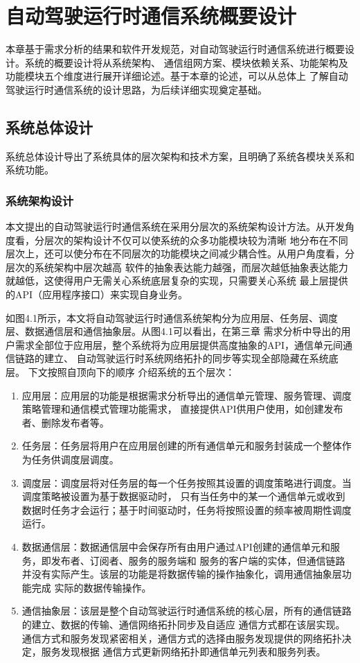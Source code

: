 \chapter{自动驾驶运行时通信系统概要设计}
本章基于需求分析的结果和软件开发规范，对自动驾驶运行时通信系统进行概要设计。系统的概要设计将从系统架构、
通信组网方案、模块依赖关系、功能架构及功能模块五个维度进行展开详细论述。基于本章的论述，可以从总体上
了解自动驾驶运行时通信系统的设计思路，为后续详细实现奠定基础。

\section{系统总体设计}
系统总体设计导出了系统具体的层次架构和技术方案，且明确了系统各模块关系和系统功能。
\subsection{系统架构设计}
本文提出的自动驾驶运行时通信系统在采用分层次的系统架构设计方法。从开发角度看，分层次的架构设计不仅可以使系统的众多功能模块较为清晰
地分布在不同层次上，还可以使分布在不同层次的功能模块之间减少耦合性。从用户角度看，分层次的系统架构中层次越高
软件的抽象表达能力越强，而层次越低抽象表达能力就越低，这使得用户无需关心系统底层复杂的实现，只需要关心系统
最上层提供的API（应用程序接口）来实现自身业务。

如图4.1所示，本文将自动驾驶运行时通信系统架构分为应用层、任务层、调度层、数据通信层和通信抽象层。从图4.1可以看出，在第三章
需求分析中导出的用户需求全部位于应用层，整个系统将为应用层提供高度抽象的API，通信单元间通信链路的建立、
自动驾驶运行时系统网络拓扑的同步等实现全部隐藏在系统底层。
下文按照自顶向下的顺序
介绍系统的五个层次：
\begin{enumerate}
    \item 应用层：应用层的功能是根据需求分析导出的通信单元管理、服务管理、调度策略管理和通信模式管理功能需求，
    直接提供API供用户使用，如创建发布者、删除发布者等。
    \item 任务层：任务层将用户在应用层创建的所有通信单元和服务封装成一个整体作为任务供调度层调度。
    \item 调度层：调度层将对任务层的每一个任务按照其设置的调度策略进行调度。当调度策略被设置为基于数据驱动时，
    只有当任务中的某一个通信单元或收到数据时任务才会运行；基于时间驱动时，任务将按照设置的频率被周期性调度运行。
    \item 数据通信层：数据通信层中会保存所有由用户通过API创建的通信单元和服务，即发布者、订阅者、服务的服务端和
    服务的客户端的实体，但通信链路并没有实际产生。该层的功能是将数据传输的操作抽象化，调用通信抽象层功能完成
    实际的数据传输操作。
    \item 通信抽象层：该层是整个自动驾驶运行时通信系统的核心层，所有的通信链路的建立、数据的传输、通信网络拓扑同步及自适应
    通信方式都在该层实现。通信方式和服务发现紧密相关，通信方式的选择由服务发现提供的网络拓扑决定，服务发现根据
    通信方式更新网络拓扑即通信单元列表和服务列表。
\end{enumerate}

